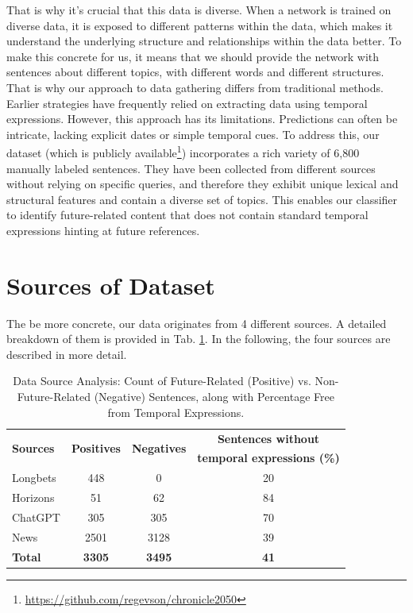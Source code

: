 \documentclass[a4paper,10pt]{report} %
\begin{document}
That is why it's crucial that this data is diverse. When a network is trained on diverse data, it is exposed to different patterns within the data, which makes it understand the underlying structure and relationships within the data better. To make this concrete for us, it means that we should provide the network with sentences about different topics, with different words and different structures. That is why our approach to data gathering differs from traditional methods. Earlier strategies have frequently relied on extracting data using temporal expressions. However, this approach has its limitations. Predictions can often be intricate, lacking explicit dates or simple temporal cues. To address this, our dataset (which is publicly available\footnote{\url{https://github.com/regevson/chronicle2050}}) incorporates a rich variety of 6,800 manually labeled sentences. They have been collected from different sources without relying on specific queries, and therefore they exhibit unique lexical and structural features and contain a diverse set of topics. This enables our classifier to identify future-related content that does not contain standard temporal expressions hinting at future references.



\section{Sources of Dataset}
The be more concrete, our data originates from 4 different sources. A detailed breakdown of them is provided in Tab. \ref{tab:dataset}. In the following, the four sources are described in more detail.

\begin{table}[h]
  \centering
  \begin{tabular}{lccc}
    \toprule
    \multirow{2}{*}{\textbf{Sources}} & \multirow{2}{*}{\textbf{Positives}} & \multirow{2}{*}{\textbf{Negatives}} & \textbf{Sentences without} \\
    & & & \textbf{temporal expressions (\%)} \\
    \midrule
    Longbets & 448 & 0 & 20 \\
    Horizons & 51 & 62 & 84 \\
    ChatGPT & 305 & 305 & 70 \\
    News & 2501 & 3128 & 39 \\
    \bottomrule
    \textbf{Total} & \textbf{3305} & \textbf{3495} & \textbf{41} \\
  \bottomrule
  \end{tabular}
  \caption{Data Source Analysis: Count of Future-Related (Positive) vs. Non-Future-Related (Negative) Sentences, along with Percentage Free from Temporal Expressions.}
  \label{tab:dataset}
\end{table}
\end{document}
